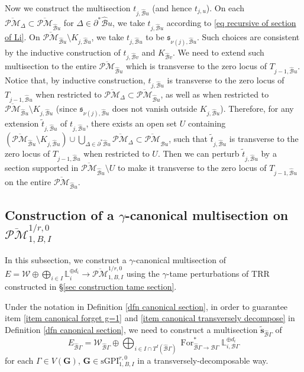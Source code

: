 \documentclass[11pt]{amsart}
\theoremstyle{definition}
\theoremstyle{remark}
\newcommand{\oPMb}{{\overline{\mathcal{PM}}}}
\newcommand{\<}{\left<}
\renewcommand{\>}{\right>}
\numberwithin{equation}{section}
\def\sGPI{\text{sGPI}}
\begin{document}
    Now we construct the multisection $t_{j,{\hat{\mathcal B}u}}$ (and hence $t_{j,u}$). 
    On each $\oPMb_\Delta\subset \oPMb_{\hat{\mathcal B}u}$ for $\Delta\in \partial^*{\hat{\mathcal B}u}$, we take $t_{j,{\hat{\mathcal B}u}}$ according to \eqref{eq recursive of section of Li}. 
    On $\oPMb_{\hat{\mathcal B}u}\setminus K_{j,\hat{\mathcal B}u}$, we take  $t_{j,{\hat{\mathcal B}u}}$ to be $\mathfrak{s}_{\nu(j),\hat{\mathcal B}u}$. Such choices are consistent by the inductive construction of $t_{j,{\hat{\mathcal B}v}}$ and $K_{\hat{\mathcal B}v}$. 
    We need to extend such multisection to the entire $\oPMb_{\hat{\mathcal B}u}$ which is transverse to the zero locus of $T_{j-1,{\hat{\mathcal B}u}}$. 
    Notice that, by inductive construction, $t_{j,{\hat{\mathcal B}u}}$ is transverse to the zero locus of $T_{j-1,{\hat{\mathcal B}u}}$ when restricted to $\oPMb_\Delta\subset \oPMb_{\hat{\mathcal B}u}$, as well as when restricted to $\oPMb_{\hat{\mathcal B}u}\setminus K_{j,\hat{\mathcal B}u}$ (since $\mathfrak{s}_{\nu(j),\hat{\mathcal B}u}$ does not vanish outside $K_{j,\hat{\mathcal B}u}$). 
    Therefore, for any extension $\tilde{t}_{j,{\hat{\mathcal B}u}}$ of $t_{j,{\hat{\mathcal B}u}}$, there exists an open set $U$ containing  $\left(\oPMb_{\hat{\mathcal B}u}\setminus K_{j,\hat{\mathcal B}u}\right)\cup \bigcup_{\Delta\in  \partial^*{\hat{\mathcal B}u}}\oPMb_\Delta\subset \oPMb_{\hat{\mathcal B}u}$, such that $\tilde{t}_{j,{\hat{\mathcal B}u}}$ is transverse to the zero locus of $T_{j-1,{\hat{\mathcal B}u}}$ when restricted to $U$. 
    Then we can perturb $\tilde{t}_{j,{\hat{\mathcal B}u}}$ by a section supported in $\oPMb_{\hat{\mathcal B}u}\setminus U$ to make it transverse to the zero locus of $T_{j-1,{\hat{\mathcal B}u}}$ on the entire $\oPMb_{\hat{\mathcal B}u}$.
    


\subsection{Construction of a $\gamma$-canonical multisection on $\oPMb^{1/r,0}_{1,B,I}$} \label{sec extend canonical to global glued}

In this subsection, we construct a $\gamma$-canonical multisection of $E=\mathcal W \oplus \bigoplus_{i\in I} \mathbb L_i^{\oplus d_i}\to \oPMb^{1/r,0}_{1,B,I}$ using the $\gamma$-tame perturbations of TRR constructed in \S \ref{sec construction tame section}. 

Under the notation in Definition \ref{dfn canonical section}, in order to guarantee item \ref{item canonical forget g=1} and \ref{item canonical transversely decompose} in Definition \ref{dfn canonical section}, we need to construct a multisection $\tilde{\bm{s}}_{\hat{\mathcal B}\Gamma}$ of 
$$
E_{\hat{\mathcal B}\Gamma}=\mathcal W_{\hat{\mathcal B}\Gamma}\oplus \bigoplus_{i\in I\cap T^I(\hat{\mathcal B}\Gamma)} \operatorname{For}^*_{\hat{\mathcal B}\Gamma\to \mathcal B \Gamma}\mathbb L_{i,\mathcal B \Gamma}^{\oplus d_i}
$$
for each $\Gamma \in V(\bm{G})$, $\bm{G}\in \sGPI^{r,0}_{1,B,I}$ in a transversely-decomposable way.
\end{document}
